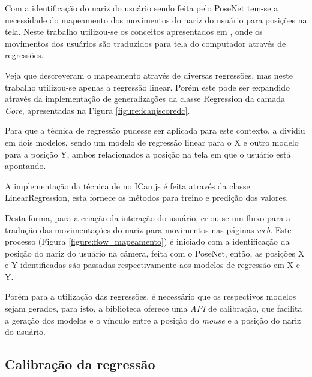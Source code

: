 \par Com a identificação do nariz do usuário sendo feita pelo PoseNet tem-se a necessidade do mapeamento dos movimentos do nariz do usuário para posições na tela. Neste trabalho utilizou-se os conceitos apresentados em \cite{Papoutsaki2016}, onde os movimentos dos usuários são traduzidos para tela do computador através de regressões.

\par Veja que  descreveram o mapeamento através de diversas regressões, mas neste trabalho utilizou-se apenas a regressão linear. Porém este pode ser expandido através da implementação de generalizações da classe Regression da camada \textit{Core}, apresentadas na Figura \ref{figure:icanjscoredc}.

\par Para que a técnica de regressão pudesse ser aplicada para este contexto,  a dividiu em dois modelos, sendo um modelo de regressão linear para o X e outro modelo para a posição Y, ambos relacionados a posição na tela em que o usuário está apontando.

\par A implementação da técnica de \cite{Papoutsaki2016} no ICan.js é feita através da classe LinearRegression, esta fornece os métodos para treino e predição dos valores.

\par Desta forma, para a criação da interação do usuário, criou-se um fluxo para a tradução das movimentações do nariz para movimentos nas páginas \textit{web}. Este processo (Figura \ref{figure:flow_mapeamento}) é iniciado com a identificação da posição do nariz do usuário na câmera, feita com o PoseNet, então, as posições X e Y identificadas são passadas respectivamente aos modelos de regressão em X e Y.


\par Porém para a utilização das regressões, é necessário que os respectivos modelos sejam gerados, para isto, a biblioteca oferece uma \textit{API} de calibração, que facilita a geração dos modelos e o vínculo entre a posição do \textit{mouse} e a posição do nariz do usuário.

\subsection{Calibração da regressão}


